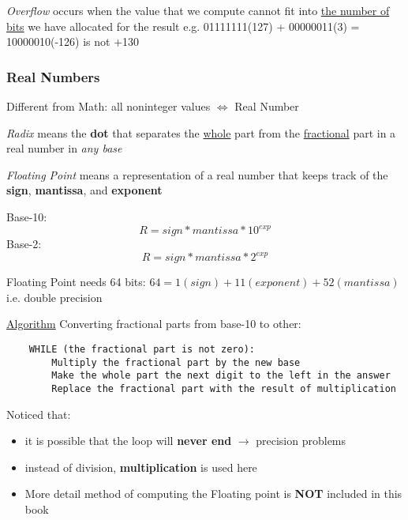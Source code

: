 \documentclass[12pt]{article}
\begin{document}
\emph{Overflow} occurs when the value that we compute cannot fit into \underline{the number of bits} we have allocated for the result\newline
e.g. 01111111(127) + 00000011(3) = 10000010(-126) is not +130

\subsubsection{Real Numbers}
Different from Math: all noninteger values $\Leftrightarrow$ Real Number

\emph{Radix} means the \textbf{dot} that separates the \underline{whole} 
part from the \underline{fractional} part in a real number in \textit{any base}

\emph{Floating Point} means a representation of a real number that keeps track of the \textbf{sign}, \textbf{mantissa}, and \textbf{exponent}

Base-10:
\begin{equation}
    R = sign * mantissa * 10^{exp}
\end{equation}
Base-2:
\begin{equation}
    R = sign * mantissa * 2^{exp}
\end{equation}

Floating Point needs 64 bits: $64 = 1(sign) + 11(exponent) + 52(mantissa)$ i.e. double precision

\underline{Algorithm} Converting fractional parts from base-10 to other:
\begin{lstlisting}
    WHILE (the fractional part is not zero):
        Multiply the fractional part by the new base
        Make the whole part the next digit to the left in the answer
        Replace the fractional part with the result of multiplication
\end{lstlisting}

Noticed that:
\begin{itemize}
    \item it is possible that the loop will \textbf{never end} $\rightarrow$ precision problems
    \item instead of division, \textbf{multiplication} is used here
    \item More detail method of computing the Floating point is \textbf{NOT} included in this book
\end{itemize}
\end{document}
